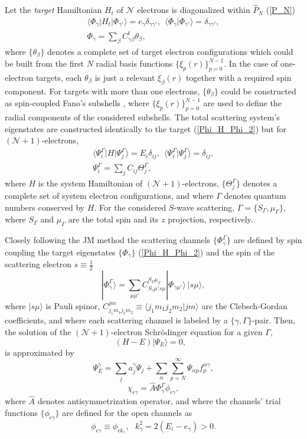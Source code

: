 \documentclass[aip
, pra
, showpacs
, aps
, twocolumn
, groupedaddress
, floatfix
]{revtex4}
\newcommand{\beq}{\begin{equation}}
\newcommand{\eeq}{\end{equation}}
\newcommand{\barr}{\begin{array}}
\newcommand{\earr}{\end{array}}
\begin{document}
Let the {\em target} Hamiltonian $H_t$ of
$\mathcal{N}$ electrons
is diagonalized within $\hat{P}_N$ (\ref{P_N})
\beq \barr{l}
\langle \Phi_\gamma|H_t|\Phi_{\gamma'}\rangle=e_\gamma \delta_{\gamma\gamma'}, \ \
\langle \Phi_\gamma|\Phi_{\gamma'}\rangle=\delta_{\gamma\gamma'},\\
\Phi_\gamma = \sum_{\beta} C^t_{\gamma \beta} \theta_\beta,
\earr \label{Phi_H_Phi_2} \eeq
where $\{\theta_\beta\}$ denotes a complete set of target electron configurations which could be built from
the first $N$ radial basis functions $\{\xi_p(r)\}_{p=0}^{N-1}$.
In the case of one-electron targets, each
$\theta_\beta$ is just a relevant $\xi_\beta(r)$ together with a required spin component.
For targets with more than one electrons, $\{\theta_\beta\}$ could be constructed as spin-coupled Fano's subshells \cite{Fano65,KFB11},
where $\{\xi_p(r)\}_{p=0}^{N-1}$ are used to define the radial components of the considered subshells.
The total scattering system's eigenstates are constructed identically to the target (\ref{Phi_H_Phi_2})
but for $(\mathcal{N}+1)$-electrons,
\beq \barr{l}
\langle\Psi_i^\Gamma|H|\Psi_j^\Gamma\rangle=E_i\delta_{ij}, \ \
 \langle\Psi_i^\Gamma|\Psi_j^\Gamma\rangle=\delta_{ij},\\
\Psi^\Gamma_i = \sum_{j} C_{ij} \Theta^\Gamma_j,
\earr \label{Psi_H_Psi_2} \eeq
where $H$ is the system Hamiltonian of $(\mathcal{N}+1)$-electrons, $\{\Theta_j^\Gamma\}$
denotes a complete set of system electron configurations, and where
$\Gamma$ denotes quantum numbers conserved by $H$.
For the considered $S$-wave scattering,
$\Gamma=\{S_\Gamma,\mu_\Gamma\}$, where $S_\Gamma$ and $\mu_\Gamma$ are the total spin and its $z$ projection, respectively.


Closely following the JM method \cite{BR76p1491, KFB11} the scattering channels $\{\Phi_\gamma^\Gamma\}$ are defined by spin coupling the target eigenstates
$\{\Phi_\gamma\}$ (\ref{Phi_H_Phi_2})
and the spin of the scattering electron
$s\equiv \frac{1}{2}$
\beq
| \Phi_{\gamma}^{\Gamma} \rangle = \sum_{\mu \mu'}
C_{S_\gamma \mu' s \mu}^{S_\Gamma \mu_\Gamma}
|\Phi_{\gamma \mu'} \rangle \ |s \mu  \rangle,
\label{chi_phi_Gamma} \eeq
where $|s \mu \rangle$ is Pauli spinor,
$C_{j_1m_1j_2m_2}^{jm} \equiv \langle j_1m_1 j_2 m_2| jm\rangle$ are the Clebsch-Gordan coefficients,
and where each scattering channel is labeled by a $\{\gamma, \Gamma\}$-pair.
Then, the solution of the $(\mathcal{N}+1)$-electron Schr\"odinger equation for a given $\Gamma$,
\beq
(H-E) | \Psi_E \rangle =0,  \ \ \  \label{H_E_Psi_E_2}
\eeq
is approximated by
\beq
 \Psi_{E}^\gamma  =  \sum_j a_j^\gamma \Psi_j  
+ \sum_{\alpha}  \sum_{p=N}^\infty \Psi_{\alpha p} f_p^{\alpha \gamma},
\eeq
\beq
\chi_{\epsilon \gamma} = \hat{A} \Phi^\Gamma_{\gamma}  \phi_{\epsilon \gamma},
\eeq
where $\hat{A}$ denotes antisymmetrization operator,
and where the channels' trial functions $\{ \phi_{\epsilon \gamma} \}$ are defined for the open channels as
\beq
\phi_{\epsilon \gamma}\equiv \phi_{\epsilon k_\gamma}, \ \ \   k_{\gamma}^2 = 2(E_i - e_\gamma) > 0.
\eeq
\end{document}
